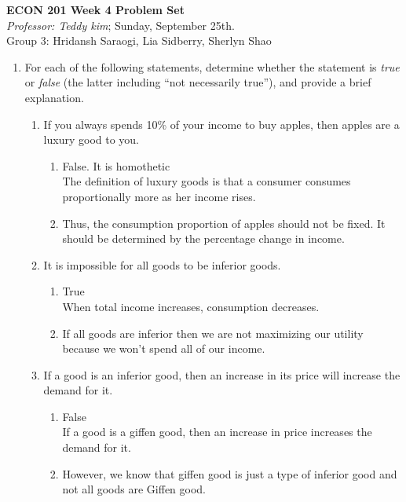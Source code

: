 \documentclass[11pt]{article}
\begin{document}
\begin{center}
\textbf{ECON 201 Week 4 Problem Set}\\
\textit {Professor: Teddy kim};  
Sunday, September 25th.
\\Group 3: Hridansh Saraogi, Lia Sidberry, Sherlyn Shao
\end{center}

\begin{enumerate}
\item For each of the following statements, determine whether
the statement is \emph{true} or \emph{false} (the latter including ``not necessarily true''), and provide a brief explanation.

    \begin{enumerate}
    \item If you always spends 10\% of your income to buy apples, then apples are a luxury good to you.
    \begin{enumerate}
        \item False. It is homothetic\\
        The definition of luxury goods is that a consumer consumes proportionally more as her income rises. \item Thus, the consumption proportion of apples should not be fixed. It should be determined by the percentage change in income.
    \end{enumerate}

    \item It is impossible for all goods to be inferior goods.
    \begin{enumerate}
        \item True\\
        When total income increases, consumption decreases.
        \item If all goods are inferior then we are not maximizing our utility because we won’t spend all of our income.
    \end{enumerate}

    \item If a good is an inferior good, then an increase in its price will increase the demand for it.
    \begin{enumerate}
        \item False\\
        If a good is a giffen good, then an increase in price increases the demand for it.
        \item However, we know that giffen good is just a type of inferior good and not all goods are Giffen good.
    \end{enumerate}


\end{enumerate}
\end{enumerate}
\end{document}
